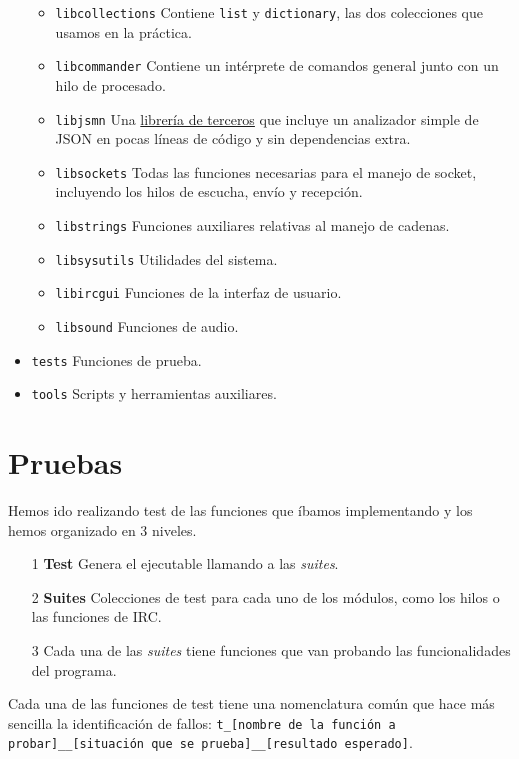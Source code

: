 \documentclass{article}
\begin{document}
\begin{itemize}
\begin{itemize}
\item \texttt{libcollections} Contiene \texttt{list} y \texttt{dictionary}, las dos colecciones que usamos en la práctica.
\item \texttt{libcommander} Contiene un intérprete de comandos general junto con un hilo de procesado.
\item \texttt{libjsmn} Una \href{http://zserge.bitbucket.org/jsmn.html}{librería de terceros} que incluye un analizador simple de JSON en pocas líneas de código y sin dependencias extra.
\item \texttt{libsockets} Todas las funciones necesarias para el manejo de socket, incluyendo los hilos de escucha, envío y recepción.
\item \texttt{libstrings} Funciones auxiliares relativas al manejo de cadenas.
\item \texttt{libsysutils} Utilidades del sistema.
\item \texttt{libircgui} Funciones de la interfaz de usuario.
\item \texttt{libsound} Funciones de audio.
\end{itemize}
\item \texttt{tests} Funciones de prueba.
\item \texttt{tools} Scripts y herramientas auxiliares.
\end{itemize}

\section{Pruebas}
Hemos ido realizando test de las funciones que íbamos implementando y los hemos organizado en 3 niveles. 

\begin{itemize}
\item[1] \textbf{Test} Genera el ejecutable llamando a las \textit{suites}.
\item[2] \textbf{Suites} Colecciones de test para cada uno de los módulos, como los hilos o las funciones de IRC.
\item[3] Cada una de las \textit{suites} tiene funciones que van probando las funcionalidades del programa.
\end{itemize}

Cada una de las funciones de test tiene una nomenclatura común que hace más sencilla la identificación de fallos: \texttt{t\_[nombre de la función a probar]\_\_[situación que se prueba]\_\_[resultado esperado]}.
\end{document}
